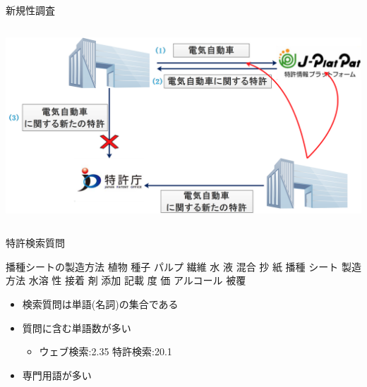 \documentclass[14pt,xcolor=dvipsnames,table,dvipdfmx]{beamer}
\begin{document}
\begin{frame}{新規性調査}
\begin{columns}[t]
    \begin{column}{0.8\textwidth} %
      	\includegraphics[width=\columnwidth]{rk2.png}
    \end{column}
\end{columns}
\end{frame}

\begin{frame}{特許検索質問}
	\fontsize{10pt}{7.2}\selectfont
	\begin{exampleblock}{播種シートの製造方法}
		植物 種子 パルプ 繊維 水 液 混合 抄 紙 播種 シート 製造 方法 水溶 性 接着 剤 添加 記載 度 価 アルコール 被覆
	\end{exampleblock}
	\fontsize{14pt}{7.2}\selectfont
	\begin{block}{}
    \begin{itemize}
        \item 検索質問は単語(名詞)の集合である
        \item 質問に含む単語数が多い
		\begin{itemize}
			\item ウェブ検索:2.35 特許検索:20.1
		\end{itemize}
		\item 専門用語が多い
    \end{itemize}
	\end{block}
\end{frame}
\end{document}
